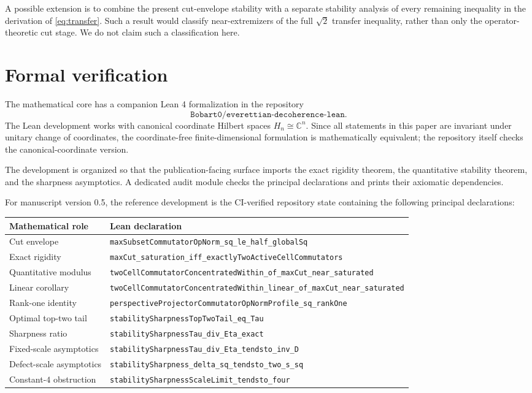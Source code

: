 \documentclass[11pt]{article}
\newcommand{\C}{\mathbb{C}}
\begin{document}
A possible extension is to combine the present cut-envelope stability with a
separate stability analysis of every remaining inequality in the derivation
of \eqref{eq:transfer}.  Such a result would classify near-extremizers of the
full $\sqrt2$ transfer inequality, rather than only the operator-theoretic cut
stage.  We do not claim such a classification here.

\section{Formal verification}

The mathematical core has a companion Lean 4 formalization in the repository
\[
  \texttt{Bobart0/everettian-decoherence-lean}.
\]
The Lean development works with canonical coordinate Hilbert spaces
$H_n\cong\C^n$.  Since all statements in this paper are invariant under
unitary change of coordinates, the coordinate-free finite-dimensional
formulation is mathematically equivalent; the repository itself checks the
canonical-coordinate version.

The development is organized so that the publication-facing surface imports
the exact rigidity theorem, the quantitative stability theorem, and the
sharpness asymptotics.  A dedicated audit module checks the principal
declarations and prints their axiomatic dependencies.

For manuscript version 0.5, the reference development is the CI-verified
repository state containing the following principal declarations:
\begin{center}
\begin{tabular}{p{}p{}}
\hline
Mathematical role & Lean declaration\\
\hline
Cut envelope &
\texttt{maxSubsetCommutatorOpNorm\_sq\_le\_half\_globalSq}\\
Exact rigidity &
\texttt{maxCut\_saturation\_iff\_exactlyTwoActiveCellCommutators}\\
Quantitative modulus &
\texttt{twoCellCommutatorConcentratedWithin\_of\_maxCut\_near\_saturated}\\
Linear corollary &
\texttt{twoCellCommutatorConcentratedWithin\_linear\_of\_maxCut\_near\_saturated}\\
Rank-one identity &
\texttt{perspectiveProjectorCommutatorOpNormProfile\_sq\_rankOne}\\
Optimal top-two tail &
\texttt{stabilitySharpnessTopTwoTail\_eq\_Tau}\\
Sharpness ratio &
\texttt{stabilitySharpnessTau\_div\_Eta\_exact}\\
Fixed-scale asymptotics &
\texttt{stabilitySharpnessTau\_div\_Eta\_tendsto\_inv\_D}\\
Defect-scale asymptotics &
\texttt{stabilitySharpness\_delta\_sq\_tendsto\_two\_s\_sq}\\
Constant-$4$ obstruction &
\texttt{stabilitySharpnessScaleLimit\_tendsto\_four}\\
\hline
\end{tabular}
\end{center}
\end{document}
